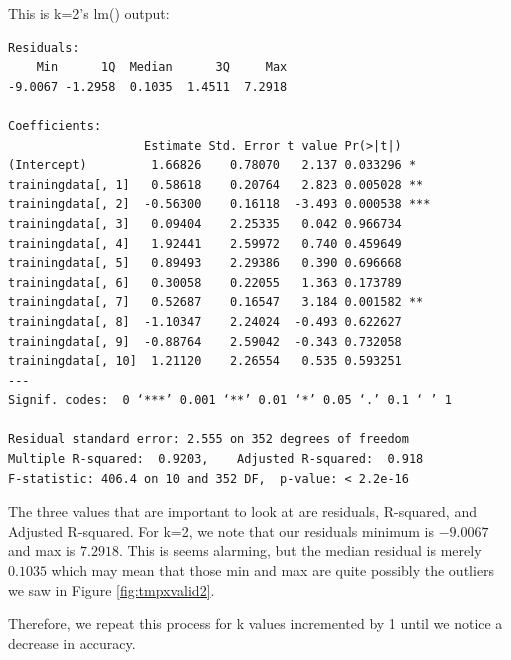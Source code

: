 \documentclass[12pt]{article}
\begin{document}
This is k=2's lm() output:
\begin{verbatim}
Residuals:
    Min      1Q  Median      3Q     Max 
-9.0067 -1.2958  0.1035  1.4511  7.2918 

Coefficients:
                   Estimate Std. Error t value Pr(>|t|)    
(Intercept)         1.66826    0.78070   2.137 0.033296 *  
trainingdata[, 1]   0.58618    0.20764   2.823 0.005028 ** 
trainingdata[, 2]  -0.56300    0.16118  -3.493 0.000538 ***
trainingdata[, 3]   0.09404    2.25335   0.042 0.966734    
trainingdata[, 4]   1.92441    2.59972   0.740 0.459649    
trainingdata[, 5]   0.89493    2.29386   0.390 0.696668    
trainingdata[, 6]   0.30058    0.22055   1.363 0.173789    
trainingdata[, 7]   0.52687    0.16547   3.184 0.001582 ** 
trainingdata[, 8]  -1.10347    2.24024  -0.493 0.622627    
trainingdata[, 9]  -0.88764    2.59042  -0.343 0.732058    
trainingdata[, 10]  1.21120    2.26554   0.535 0.593251    
---
Signif. codes:  0 ‘***’ 0.001 ‘**’ 0.01 ‘*’ 0.05 ‘.’ 0.1 ‘ ’ 1

Residual standard error: 2.555 on 352 degrees of freedom
Multiple R-squared:  0.9203,	Adjusted R-squared:  0.918 
F-statistic: 406.4 on 10 and 352 DF,  p-value: < 2.2e-16
\end{verbatim}

The three values that are important to look at are residuals, R-squared, and Adjusted R-squared. For k=2, we note that our residuals minimum is $-9.0067$ and max is $7.2918$. This is seems alarming, but the median residual is merely $0.1035$ which may mean that those min and max are quite possibly the outliers we saw in Figure \ref{fig:tmpxvalid2}.

Therefore, we repeat this process for k values incremented by 1 until we notice a decrease in accuracy.
\end{document}
